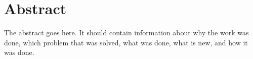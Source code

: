 \documentclass[12pt, a4paper, twoside]{report} %
\theoremstyle{plainspaced}
\theoremstyle{plainspaced}
\theoremstyle{definitionspaced}
\newcommand\blankpage{%
	\null
	\newpage}
\newenvironment{comment}{\begin{framed} \footnotesize \textcolor{red}{\textbf{Comment.}}}{\end{framed} \normalsize}
\begin{document}
	
	
	
	\pagestyle{empty}
	\afterpage{\blankpage}
	
	
	\section*{Abstract}
	\pagestyle{normal}
	
	The abstract goes here.
	It should contain information about why the work was done, which problem that was solved, what was done, what is new, and how it was done.
	
	
	
	
	
%	
%	
	
\end{document}
